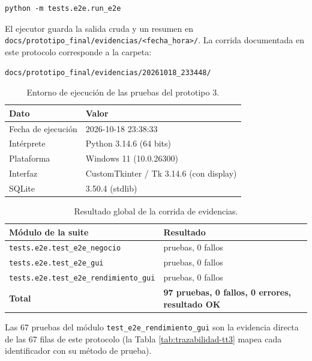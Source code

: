 \documentclass[12pt,letterpaper]{article}
\begin{document}
\begin{verbatim}
python -m tests.e2e.run_e2e
\end{verbatim}

El ejecutor guarda la salida cruda y un resumen en \texttt{docs/prototipo\_final/evidencias/<fecha\_hora>/}. La corrida documentada en este protocolo corresponde a la carpeta:

\begin{center}
\texttt{docs/prototipo\_final/evidencias/20261018\_233448/}
\end{center}

\begin{table}[H]
\centering
\renewcommand{\arraystretch}{1.2}
\begin{tabularx}{\textwidth}{|p{4.5cm}|X|}
\hline
\textbf{Dato} & \textbf{Valor} \\ \hline
Fecha de ejecución & 2026-10-18 23:38:33 \\ \hline
Intérprete & Python 3.14.6 (64 bits) \\ \hline
Plataforma & Windows 11 (10.0.26300) \\ \hline
Interfaz & CustomTkinter / Tk 3.14.6 (con display) \\ \hline
SQLite & 3.50.4 (stdlib) \\ \hline
\end{tabularx}
\caption{Entorno de ejecución de las pruebas del prototipo 3.}
\label{tab:entorno-ejecucion-tt3}
\end{table}

\begin{table}[H]
\centering
\renewcommand{\arraystretch}{1.2}
\begin{tabularx}{\textwidth}{|X|>{\centering\arraybackslash}p{2.6cm}|}
\hline
\textbf{Módulo de la suite} & \textbf{Resultado} \\ \hline
\texttt{tests.e2e.test\_e2e\_negocio} & 15 pruebas, 0 fallos \\ \hline
\texttt{tests.e2e.test\_e2e\_gui} & 15 pruebas, 0 fallos \\ \hline
\texttt{tests.e2e.test\_e2e\_rendimiento\_gui} & 67 pruebas, 0 fallos \\ \hline
\textbf{Total} & \textbf{97 pruebas, 0 fallos, 0 errores, resultado OK} \\ \hline
\end{tabularx}
\caption{Resultado global de la corrida de evidencias.}
\label{tab:resultado-global-tt3}
\end{table}

Las 67 pruebas del módulo \texttt{test\_e2e\_rendimiento\_gui} son la evidencia directa de las 67 filas de este protocolo (la Tabla \ref{tab:trazabilidad-tt3} mapea cada identificador con su método de prueba).
\end{document}
